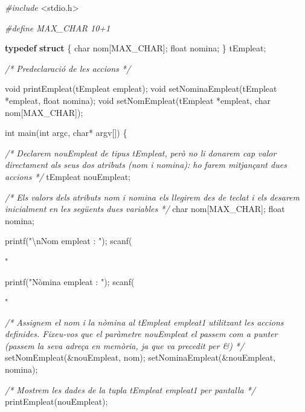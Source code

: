 \documentclass[]{book}
\newenvironment{Shaded}{\begin{snugshade}}{\end{snugshade}}
\newcommand{\KeywordTok}[1]{\textcolor[rgb]{0.13,0.29,0.53}{\textbf{#1}}}
\newcommand{\DataTypeTok}[1]{\textcolor[rgb]{0.13,0.29,0.53}{#1}}
\newcommand{\SpecialCharTok}[1]{\textcolor[rgb]{0.00,0.00,0.00}{#1}}
\newcommand{\StringTok}[1]{\textcolor[rgb]{0.31,0.60,0.02}{#1}}
\newcommand{\ImportTok}[1]{#1}
\newcommand{\CommentTok}[1]{\textcolor[rgb]{0.56,0.35,0.01}{\textit{#1}}}
\newcommand{\PreprocessorTok}[1]{\textcolor[rgb]{0.56,0.35,0.01}{\textit{#1}}}
\newcommand{\NormalTok}[1]{#1}
\begin{document}
\begin{Shaded}
\begin{Highlighting}[]
\PreprocessorTok{#include }\ImportTok{<stdio.h>}

\PreprocessorTok{#define MAX_CHAR 10+1}

\KeywordTok{typedef} \KeywordTok{struct}\NormalTok{ \{}
   \DataTypeTok{char}\NormalTok{ nom[MAX_CHAR];}
   \DataTypeTok{float}\NormalTok{ nomina;}
\NormalTok{\} tEmpleat;}

\CommentTok{/* Predeclaració de les accions */}

\DataTypeTok{void}\NormalTok{ printEmpleat(tEmpleat empleat);}
\DataTypeTok{void}\NormalTok{ setNominaEmpleat(tEmpleat *empleat, }\DataTypeTok{float}\NormalTok{ nomina);}
\DataTypeTok{void}\NormalTok{ setNomEmpleat(tEmpleat *empleat, }\DataTypeTok{char}\NormalTok{ nom[MAX_CHAR]);}

\DataTypeTok{int}\NormalTok{ main(}\DataTypeTok{int}\NormalTok{ argc, }\DataTypeTok{char}\NormalTok{* argv[]) \{}

   \CommentTok{/* Declarem nouEmpleat de tipus tEmpleat,}
\CommentTok{      però no li donarem cap valor directament}
\CommentTok{      als seus dos atributs (nom i nomina): ho }
\CommentTok{      farem mitjançant dues accions */}
\NormalTok{   tEmpleat nouEmpleat;}
   
   \CommentTok{/* Els valors dels atributs nom i nomina els}
\CommentTok{      llegirem des de teclat i els desarem inicialment}
\CommentTok{      en les següents dues variables */}
   \DataTypeTok{char}\NormalTok{ nom[MAX_CHAR];}
   \DataTypeTok{float}\NormalTok{ nomina;}
   
\NormalTok{   printf(}\StringTok{"}\SpecialCharTok{\textbackslash{}n}\StringTok{Nom empleat : "}\NormalTok{);}
\NormalTok{   scanf(}\StringTok{"%
      
\NormalTok{   printf(}\StringTok{"Nòmina empleat : "}\NormalTok{);}
\NormalTok{   scanf(}\StringTok{"%
   
   \CommentTok{/* Assignem el nom i la nòmina al tEmpleat empleat1}
\CommentTok{      utilitzant les accions definides. Fixeu-vos}
\CommentTok{      que el paràmetre nouEmpleat el passem com a punter}
\CommentTok{      (passem la seva adreça en memòria, ja que va }
\CommentTok{      precedit per &) */}
\NormalTok{   setNomEmpleat(&nouEmpleat, nom);}
\NormalTok{   setNominaEmpleat(&nouEmpleat, nomina);}
   
   \CommentTok{/* Mostrem les dades de la tupla tEmpleat empleat1}
\CommentTok{      per pantalla */}
\NormalTok{   printEmpleat(nouEmpleat);}

}}
\end{Highlighting}
\end{Shaded}
\end{document}
